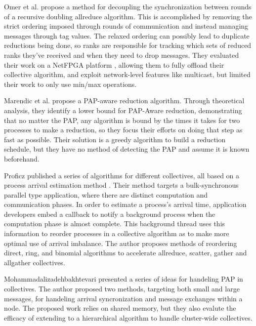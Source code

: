 Omer et al. \cite{Arap2015AdaptiveRDForCC} propose a method for decoupling the synchronization between rounds of a recursive doubling allreduce algorithm. 
This is accomplished by removing the strict ordering imposed through rounds of communication and instead managing messages through tag values.
The relaxed ordering can possibly lead to duplicate reductions being done, so ranks are responsible for tracking which sets of reduced ranks they've received and when they need to drop messages.
They evaluated their work on a NetFPGA platform \cite{Lockwood2007NetFPGA}, allowing them to fully offload their collective algorithm, and exploit network-level features like multicast, but limited their work to only use min/max operations.

Marendic et al. \cite{Marendic2016Clairvoyant} propose a PAP-aware reduction algorithm.
Through theoretical analysis, they identify a lower bound for PAP-Aware reduction, demonstrating that no matter the PAP, any algorithm is bound by the times it takes for two processes to make a reduction, so they focus their efforts on doing that step as fast as possible. 
Their solution is a greedy algorithm to build a reduction schedule, but they have no method of detecting the PAP and assume it is known beforehand.

Proficz published a series of algorithms for different collectives, all based on a process arrival estimation method \cite{Proficz2018ImprvAllReduceForImbPAP, Proficz2020PAPAwareScatterGather, Proficz2021AllGatherResilientToImbPAP}.
Their method targets a bulk-synchronous parallel type application, where there are distinct computation and communication phases.
In order to estimate a process's arrival time, application developers embed a callback to notify a background process when the computation phase is almost complete.
This background thread uses this information to reorder processes in a collective algorithm as to make more optimal use of arrival imbalance.
The author proposes methods of reordering direct, ring, and binomial algorithms to accelerate allreduce, scatter, gather and allgather collectives.

Mohammadalizadehbakhtevari \cite{Mohammadalizadehbakhtevari2021Thesis} presented a series of ideas for handeling PAP in collectives. 
The author proposed two methods, targeting both small and large messages, for handeling arrival syncronization and message exchanges within a node.
The proposed work relies on shared memory, but they also evalute the efficacy of extending to a hierarchical algorithm to handle cluster-wide collectives.

